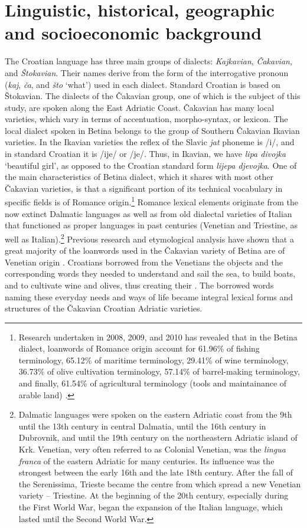 \documentclass[output=paper]{LSP/langsci}
\begin{document}
\section{Linguistic, historical, geographic and socioeconomic background}
The Croatian language has three main groups of dialects: \textit{Kajkavian}, \textit{Čakavian}, and \textit{Štokavian}. Their names derive from the form of the interrogative pronoun (\textit{kaj}, \textit{ča}, and \textit{što} ‘what’) used in each dialect. Standard Croatian is based on Štokavian. The dialects of the Čakavian group, one of which is the subject of this study, are spoken along the East Adriatic Coast. Čakavian has many local varieties, which vary in terms of accentuation, morpho-syntax, or lexicon. The local dialect spoken in Betina belongs to the group of Southern Čakavian Ikavian varieties. In the Ikavian varieties the reflex of the Slavic \textit{jat} phoneme is /i/, and in  standard Croatian it is /ije/ or /je/. Thus, in Ikavian, we have \textit{lipa divojka} `beautiful girl', as opposed to the Croatian standard form \textit{lijepa djevojka}. One of the main characteristics of Betina dialect, which it shares with most other Čakavian varieties, is that a significant portion of its technical vocabulary in specific fields is of Romance origin.\footnote{Research undertaken in 2008, 2009, and 2010 has revealed that in the Betina dialect, loanwords of Romance origin account for 61.96\% of fishing terminology, 65.12\% of maritime terminology, 29.41\% of wine terminology, 36.73\% of olive cultivation terminology, 57.14\% of barrel-making terminology, and finally, 61.54\% of agricultural terminology (tools and maintainance of arable land) \citep[254--255]{skevin_etimoloska_2010}.} Romance lexical elements originate from the now extinct Dalmatic languages as well as from old dialectal varieties of Italian that functioned as proper languages in past centuries (Venetian and Triestine, as well as Italian).\footnote{ Dalmatic languages were spoken on the eastern Adriatic coast from the 9th until the 13th century in central Dalmatia, until the 16th century in Dubrovnik, and until the 19th century on the northeastern Adriatic island of Krk. Venetian, very often referred to as Colonial Venetian, was the \textit{lingua franca }of the eastern Adriatic for many centuries. Its influence was the strongest between the early 16th and the late 18th century. After the fall of the Serenissima, Trieste became the centre from which spread a new Venetian variety – Triestine. At the beginning of the 20th century, especially during the First World War, began the expansion of the Italian language, which lasted until the Second World War.} Previous research and etymological analysis have shown that a great majority of the loanwords used in the Čakavian variety of Betina are of Venetian origin \citep{filipi_betinska_1997,skevin_etimoloska_2010}. Croatians borrowed from the Venetians the objects and the corresponding words they needed to understand and sail the sea, to build boats, and to cultivate wine and olives, thus creating their . The borrowed words naming these everyday needs and ways of life became integral lexical forms and structures of the Čakavian Croatian Adriatic varieties.
\end{document}
